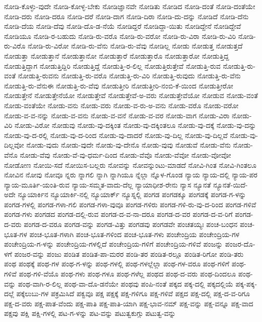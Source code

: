 {ನೋಡಿ-ಕೊಳ್ಳು-ವುದೇ
ನೋಡಿ-ಕೋಳ್ಳ-ಬೇಕು
ನೋಡಿಜ್ಞಾನವೇ
ನೋಡಿತು
ನೋಡಿದ
ನೋಡಿ-ದಂತೆ
ನೋಡಿ-ದಂತೆಯೇ
ನೋಡಿ-ದರು
ನೋಡಿ-ದರೂ
ನೋಡಿ-ದರೆ
ನೋಡಿ-ದಾಗ
ನೋಡಿ-ದಿರಾ
ನೋಡಿ-ದು-ದನ್ನು
ನೋಡಿದೆ
ನೋಡಿ-ದೆನು
ನೋಡಿ-ದೆಯ
ನೋಡಿ-ದೆವು
ನೋಡಿ-ದೊ-ಡ-ನೆಯೆ
ನೋಡಿದ್ದರೆ
ನೋಡಿದ್ದಾ-ಯಿತು
ನೋಡಿದ್ದೇನೆ
ನೋಡಿದ್ದೇವೆ
ನೋಡಿಯೂ
ನೋಡಿ-ರ-ಬಹುದು
ನೋಡಿ-ರು-ವರೊ
ನೋಡಿ-ರು-ವರೋ
ನೋಡಿ-ರು-ವಿರಾ
ನೋಡಿ-ರು-ವಿರಿ
ನೋಡಿ-ರು-ವಿರೊ
ನೋಡಿ-ರು-ವಿರೋ
ನೋಡಿ-ರು-ವೆನು
ನೋಡಿ-ರು-ವೆವು
ನೋಡಿಲ್ಲ
ನೋಡು
ನೋಡುತ್ತ
ನೋಡುತ್ತದೆ
ನೋಡುತ್ತಾ
ನೋಡುತ್ತಾನೆ
ನೋಡುತ್ತಾನೋ
ನೋಡುತ್ತಾರೆ
ನೋಡುತ್ತಾರೊ
ನೋಡುತ್ತಾರೋ
ನೋಡುತ್ತಿದ್ದ
ನೋಡುತ್ತಿದ್ದಾಗ
ನೋಡುತ್ತಿದ್ದಿರಿ
ನೋಡುತ್ತಿದ್ದೆ
ನೋಡುತ್ತಿ-ರ-ಲಿಲ್ಲ
ನೋಡುತ್ತಿರುತ್ತೇವೆ
ನೋಡುತ್ತಿ-ರುವ
ನೋಡುತ್ತಿ-ರು-ವಂತೆ
ನೋಡುತ್ತಿ-ರುವನು
ನೋಡುತ್ತಿ-ರು-ವರೊ
ನೋಡುತ್ತಿ-ರು-ವಿರಿ
ನೋಡುತ್ತಿ-ರುವುದು
ನೋಡುತ್ತಿ-ರು-ವೆನು
ನೋಡುತ್ತಿ-ರು-ವೆನುಈ
ನೋಡುತ್ತಿ-ರು-ವೆವು
ನೋಡುತ್ತೀರಿ
ನೋಡುತ್ತೀರಿ-ನಂಬಿ-ಕೆ-ಯಿಂದ
ನೋಡುತ್ತೀರೋ
ನೋಡುತ್ತೇನೆ
ನೋಡುತ್ತೇನೆಯೋ
ನೋಡುತ್ತೇವೆ
ನೋಡುತ್ತೇವೆ-ಅ-ವರು
ನೋಡುತ್ತೇವೆಯೋ
ನೋಡುವ
ನೋಡು-ವಂತೆ
ನೋಡು-ವಂತೆಯೇ
ನೋಡು-ವನು
ನೋಡು-ವರು
ನೋಡು-ವ-ರು-ಅ-ವನು
ನೋಡು-ವರೊ
ನೋಡು-ವರೋ
ನೋಡು-ವ-ವ-ನನ್ನು
ನೋಡು-ವ-ವನು
ನೋಡು-ವ-ವನೆ
ನೋಡು-ವ-ವರ
ನೋಡು-ವಾಗ
ನೋಡು-ವಿರಾ
ನೋಡು-ವಿರಿ
ನೋಡು-ವಿರೋ
ನೋಡುವು
ನೋಡು-ವು-ದಕ್ಕಿಂತ
ನೋಡು-ವು-ದಕ್ಕಿಂತಲೂ
ನೋಡು-ವು-ದಕ್ಕೆ
ನೋಡು-ವು-ದನ್ನು
ನೋಡು-ವು-ದ-ರಲ್ಲಿ
ನೋಡು-ವು-ದ-ರಿಂದ
ನೋಡು-ವು-ದಾದರೆ
ನೋಡು-ವು-ದಿಲ್ಲ
ನೋಡು-ವು-ದಿಲ್ಲವೆ
ನೋಡು-ವು-ದಿಲ್ಲವೋ
ನೋಡು-ವುದು
ನೋಡು-ವುದೇ
ನೋಡು-ವು-ದೇನೊ
ನೋಡು-ವುವು
ನೋಡುವೆ
ನೋಡು-ವೆನು
ನೋಡು-ವೆನೊ
ನೋಡು-ವೆವು
ನೋಡು-ವೆ-ವು-ಧರ್ಮ-ದಿಂದ
ನೋಡು-ವೆವೊ
ನೋಡು-ವೆವೋ
ನೋಡು-ವೋವೋ
ನೋಡೋಣ
ನೋಯಿ-ಸದೆ
ನೋಯಿಸ-ಬಲ್ಲರು
ನೋವನ್ನು
ನೋವನ್ನುಂಟು-ಮಾಡದೆ
ನೋವಿ-ಗಿಂತ
ನೋವಿ-ಗಿಂತಲೂ
ನೋವಿನ
ನೋವು
ನೋವೂ
ನ್ನರು
ನ್ನಾಗಲಿ
ನ್ನಾಗಿ
ನ್ನಾಗಿಯೂ
ನ್ನೆಲ್ಲಾ
ನ್ನೊಳ-ಗೊಂಡ
ನ್ಯಾಯ
ನ್ಯಾಯ-ದಲ್ಲಿ
ನ್ಯಾಯ-ಪರ
ನ್ಯಾಯ-ಮೂರ್ತಿ-ಯಂತಿ-ರುವ
ನ್ಯಾಯ-ಸಮ್ಮತ-ವಾದು-ದೆಲ್ಲ
ನ್ಯಾಯಾಧೀಶ-ರೇನು
ನ್ಯಾಸ
ನ್ಯೂನತೆ
ನ್ಯೂನತೆ-ಯಿದೆ-ಅದೇ
ನ್ಯೂಯಾರ್ಕಿನ
ನ್ಯೂಯಾರ್ಕಿ-ನಲ್ಲಿ
ನ್ಯೂಯಾರ್ಕ್
ನ್ಯೂಸ್ನಲ್ಲಿ
ಪಂಗಡ
ಪಂಗಡಕ್ಕೂ
ಪಂಗಡಕ್ಕೆ
ಪಂಗಡ-ಗ-ಳನ್ನು
ಪಂಗಡ-ಗಳಲ್ಲಿ
ಪಂಗಡ-ಗಳಾ-ಗಲಿ
ಪಂಗಡ-ಗಳಾ-ವುವೂ
ಪಂಗಡ-ಗಳಿರು
ಪಂಗಡ-ಗಳಿ-ರು-ವು-ದ-ರಿಂದ
ಪಂಗಡ-ಗಳಿವೆ
ಪಂಗಡ-ಗಳು
ಪಂಗಡದ
ಪಂಗಡ-ದಲ್ಲಿ-ರುವ
ಪಂಗಡ-ದ-ವ-ನಾ-ದರೂ
ಪಂಗಡ-ದ-ವರ
ಪಂಗಡ-ದ-ವ-ರಿಗೆ
ಪಂಗಡ-ದ-ವರು
ಪಂಗಡ-ದ-ವರೂ
ಪಂಗಡ-ವನ್ನು
ಪಂಗಡ-ವಿತ್ತು
ಪಂಗಡವು
ಪಂಗಡವೇ
ಪಂಚತಯ್ಯಃ
ಪಂಚ-ಬಂಧನ
ಪಂಚ-ಭೂತ-ಗಳ
ಪಂಚ-ಭೂತ-ಗಳಾಗಿ
ಪಂಚ-ಭೂತ-ಗಳಿಂದ
ಪಂಚ-ಭೂತ-ಗಳು
ಪಂಚೇಂದ್ರಿಯ
ಪಂಚೇಂದ್ರಿಯ-ಗಳ
ಪಂಚೇಂದ್ರಿಯ-ಗ-ಳನ್ನು
ಪಂಚೇಂದ್ರಿಯ-ಗಳಲ್ಲಿದೆ
ಪಂಚೇಂದ್ರಿಯ-ಗಳಿಗೆ
ಪಂಚೇಂದ್ರಿಯ-ಗಳಿವೆ
ಪಂಜನ್ನು
ಪಂಜರ-ದೊ-ಳಗೆ
ಪಂಜರ-ವನ್ನು
ಪಂಜು
ಪಂಡಿತ
ಪಂಡಿತ-ಪಾ-ಮರರ
ಪಂಡಿ-ತರ
ಪಂಡಿತ-ರಲ್ಲೂ
ಪಂಡಿತ-ರಿಗೋ
ಪಂಡಿ-ತರು
ಪಂಥ
ಪಂಥಕ್ಕೆ
ಪಂಥ-ಗಳ
ಪಂಥ-ಗ-ಳನ್ನು
ಪಂಥ-ಗಳಲ್ಲಿ
ಪಂಥ-ಗಳಲ್ಲೆಲ್ಲಾ
ಪಂಥ-ಗಳ-ವರೂ
ಪಂಥ-ಗಳಿಗೆ
ಪಂಥ-ಗಳಿವೆ
ಪಂಥ-ಗಳಿ-ವೆಯೊ
ಪಂಥ-ಗಳು
ಪಂಥ-ಗಳೂ
ಪಂಥ-ಗಳೆಲ್ಲ
ಪಂಥದ
ಪಂಥ-ದ-ವರು
ಪಂಥ-ದಿಂದಲೂ
ಪಂಥ-ವನ್ನು
ಪಂಥ-ವಾಗಿ-ರ-ಲಿಲ್ಲ
ಪಂಥ-ವಾ-ದೊ-ಡನೆಯೇ
ಪಂಥವು
ಪಂಪಿ-ನಂತೆ
ಪಕ್ಕದ
ಪಕ್ಕ-ದಲ್ಲಿ
ಪಕ್ಕದಲ್ಲಿಯೆ
ಪಕ್ಕ-ಪಕ್ಕ-ದಲ್ಲೆ
ಪಕ್ಕೆಲುಬು-ಗಳ
ಪಕ್ರಮಿಸಿದೆ
ಪಕ್ವವೂ
ಪಕ್ಷ
ಪಕ್ಷಕ್ಕೆ
ಪಕ್ಷ-ಗಳಿಗೂ
ಪಕ್ಷ-ಗಳಿವೆ
ಪಕ್ಷದ
ಪಕ್ಷ-ದಲ್ಲಿ
ಪಕ್ಷ-ದ-ವ-ರಿಗೂ
ಪಕ್ಷ-ದ-ವರು
ಪಕ್ಷ-ಪಾತ-ವೆಂದು
ಪಕ್ಷ-ಪಾತಿ
ಪಕ್ಷ-ಪಾತಿ-ಯಾಗಿ
ಪಕ್ಷ-ಭಾವ-ನಮ್
ಪಕ್ಷ-ವನ್ನು
ಪಕ್ಷ-ವನ್ನೂ
ಪಕ್ಷ-ವಾದ
ಪಕ್ಷವು
ಪಕ್ಷಿ
ಪಕ್ಷಿ-ಗಳಲ್ಲಿ
ಪಟ-ಗ-ಳನ್ನು
ಪಟ-ವನ್ನು
ಪಟುತ್ವಕುಗ್ಗು
ಪಟುತ್ವ-ವನ್ನು
}
